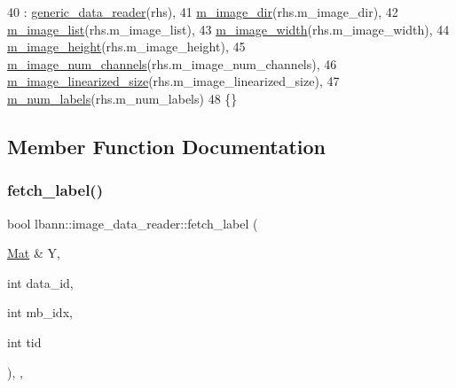 \begin{DoxyCode}
40   : \hyperlink{classlbann_1_1generic__data__reader_aaba933b8f7c1227801f6e80d39986af4}{generic\_data\_reader}(rhs),
41     \hyperlink{classlbann_1_1image__data__reader_ab1289f0207f3a9989c7b28e09a23c9a3}{m\_image\_dir}(rhs.m\_image\_dir),
42     \hyperlink{classlbann_1_1image__data__reader_ae3fc949bd08c45ceafb1a03503261008}{m\_image\_list}(rhs.m\_image\_list),
43     \hyperlink{classlbann_1_1image__data__reader_af001f3d1c0f1c580b66988233b3a64f0}{m\_image\_width}(rhs.m\_image\_width),
44     \hyperlink{classlbann_1_1image__data__reader_a0632efa3deaa9d61e671f741909eb3fe}{m\_image\_height}(rhs.m\_image\_height),
45     \hyperlink{classlbann_1_1image__data__reader_aab1a440f361521dc7bd583cefe1061f8}{m\_image\_num\_channels}(rhs.m\_image\_num\_channels),
46     \hyperlink{classlbann_1_1image__data__reader_af512f1f866c0f654309b7f28886dca9a}{m\_image\_linearized\_size}(rhs.m\_image\_linearized\_size),
47     \hyperlink{classlbann_1_1image__data__reader_af280e8758a6ec3acee7c62e6351d17e0}{m\_num\_labels}(rhs.m\_num\_labels)
48 \{\}
\end{DoxyCode}


\subsection{Member Function Documentation}
\mbox{\label{classlbann_1_1image__data__reader_a1f0dbd67390a65fef106515ea7060e29}} 
\subsubsection{\texorpdfstring{fetch\+\_\+label()}{fetch\_label()}}
{\footnotesize\ttfamily bool lbann\+::image\+\_\+data\+\_\+reader\+::fetch\+\_\+label (\begin{DoxyParamCaption}\item[{\hyperlink{base_8hpp_a68f11fdc31b62516cb310831bbe54d73}{Mat} \&}]{Y,  }\item[{int}]{data\+\_\+id,  }\item[{int}]{mb\+\_\+idx,  }\item[{int}]{tid }\end{DoxyParamCaption})\hspace{0.3cm}{\ttfamily [override]}, {\ttfamily [protected]}, {\ttfamily [virtual]}}

